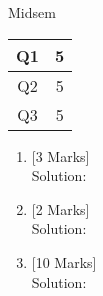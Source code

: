 \documentclass[10pt]{article}
\begin{document}
\vspace*{2cm}
\begin{center}
Midsem
\\\vspace*{1cm}
\begin{tabular}{|c|c|}
\hline Q1 & 5 \\ \hline Q2 & 5 \\ \hline Q3 & 5 \\ \hline \end{tabular}\end{center}
\begin{enumerate}\item {}\hfill
[3 Marks]
\\ Solution:\vspace*{120pt}\item {}\hfill
[2 Marks]
\\ Solution:\vspace*{80pt}\item {}\hfill
[10 Marks]
\\ Solution:\vspace*{400pt}\end{enumerate}
\end{document}
